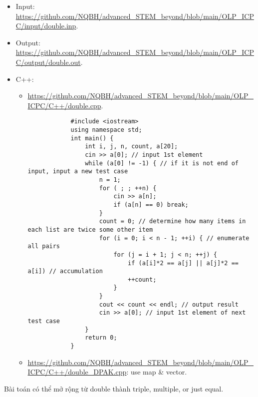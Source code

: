 \documentclass{article}
\begin{document}
\begin{itemize}
	\item Input: \url{https://github.com/NQBH/advanced_STEM_beyond/blob/main/OLP_ICPC/input/double.inp}.
	\item Output: \url{https://github.com/NQBH/advanced_STEM_beyond/blob/main/OLP_ICPC/output/double.out}.
	\item C++:
	\begin{itemize}
		\item \url{https://github.com/NQBH/advanced_STEM_beyond/blob/main/OLP_ICPC/C++/double.cpp}.
		\begin{verbatim}
			#include <iostream>
			using namespace std;
			int main() {
				int i, j, n, count, a[20];
				cin >> a[0]; // input 1st element
				while (a[0] != -1) { // if it is not end of input, input a new test case
					n = 1;
					for ( ; ; ++n) {
						cin >> a[n];
						if (a[n] == 0) break;
					}
					count = 0; // determine how many items in each list are twice some other item
					for (i = 0; i < n - 1; ++i) { // enumerate all pairs
						for (j = i + 1; j < n; ++j) {
							if (a[i]*2 == a[j] || a[j]*2 == a[i]) // accumulation
							++count;
						}
					}
					cout << count << endl; // output result
					cin >> a[0]; // input 1st element of next test case
				}
				return 0;
			}
		\end{verbatim}
		\item \url{https://github.com/NQBH/advanced_STEM_beyond/blob/main/OLP_ICPC/C++/double_DPAK.cpp}: use map \& vector.
	\end{itemize} 
\end{itemize}
Bài toán có thể mở rộng từ double thành triple, multiple, or just equal.
\end{document}

